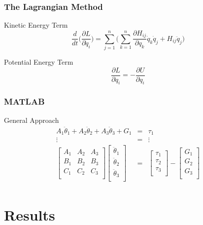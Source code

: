 \documentclass{beamer}
\begin{document}
\begin{frame}\frametitle{The Lagrangian Method}
\begin{exampleblock}{Kinetic Energy Term}
\[
\frac{d}{dt} \Big( \frac{\partial L}{\partial \dot{q}_i} \Big) = \sum_{j=1}^{n} \Big( \sum_{k=1}^{n} \frac{\partial H_{ij}}{\partial q_k} \dot{q}_k \dot{q}_j + H_{ij} \ddot{q}_j \Big)
\]
\end{exampleblock}
\begin{exampleblock}{Potential Energy Term}
\[
\frac{\partial L}{\partial q_i} = - \frac{\partial U}{ \partial q_i}
\]
\end{exampleblock}
\end{frame}

\begin{frame}\frametitle{MATLAB}

\begin{block}{General Approach}
\begin{eqnarray*}
A_{1} \ddot{\theta}_1 + A_{2} \ddot{\theta}_2 + A_{3} \ddot{\theta}_3 + G_1 & = & \tau_1\\
\vdots & = & \vdots\\
\begin{bmatrix}
A_1 & A_2 & A_3\\
B_1 & B_2 & B_3\\
C_1 & C_2 & C_3\\
\end{bmatrix}
\begin{bmatrix}
\ddot{\theta}_1 \\
\ddot{\theta}_2 \\
\ddot{\theta}_3 \\
\end{bmatrix} & = & \begin{bmatrix}
					\tau_1 \\ \tau_2 \\ \tau_3\\
				    \end{bmatrix} - \begin{bmatrix}
					G_1 \\ G_2 \\ G_3\\
				    \end{bmatrix}\\
\end{eqnarray*} 
\end{block}

\end{frame}

\section{Results}
\end{document}
